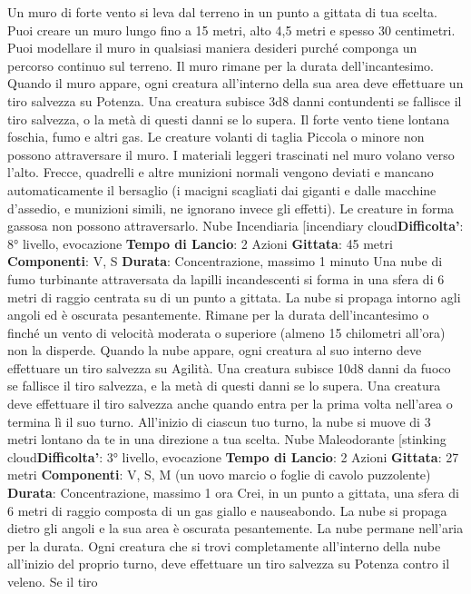\begin{multicols}{2}
Un muro di forte vento si leva dal terreno in un punto a
gittata di tua scelta. Puoi creare un muro lungo fino a 15
metri, alto 4,5 metri e spesso 30 centimetri. Puoi
modellare il muro in qualsiasi maniera desideri purché
componga un percorso continuo sul terreno. Il muro
rimane per la durata dell’incantesimo.
Quando il muro appare, ogni creatura all’interno della
sua area deve effettuare un tiro salvezza su Potenza. Una
creatura subisce 3d8 danni contundenti se fallisce il tiro
salvezza, o la metà di questi danni se lo supera.
Il forte vento tiene lontana foschia, fumo e altri gas. Le
creature volanti di taglia Piccola o minore non possono
attraversare il muro. I materiali leggeri trascinati nel
muro volano verso l’alto. Frecce, quadrelli e altre
munizioni normali vengono deviati e mancano
automaticamente il bersaglio (i macigni scagliati dai
giganti e dalle macchine d’assedio, e munizioni simili,
ne ignorano invece gli effetti). Le creature in forma
gassosa non possono attraversarlo.
Nube Incendiaria
[incendiary cloud\textbf{Difficolta'}:
8° livello, evocazione
\textbf{Tempo di Lancio}: 2 Azioni
\textbf{Gittata}: 45 metri
\textbf{Componenti}: V, S
\textbf{Durata}: Concentrazione, massimo 1 minuto
Una nube di fumo turbinante attraversata da lapilli
incandescenti si forma in una sfera di 6 metri di raggio
centrata su di un punto a gittata. La nube si propaga
intorno agli angoli ed è oscurata pesantemente. Rimane
per la durata dell’incantesimo o finché un vento di
velocità moderata o superiore (almeno 15 chilometri
all’ora) non la disperde.
Quando la nube appare, ogni creatura al suo interno
deve effettuare un tiro salvezza su Agilità. Una
creatura subisce 10d8 danni da fuoco se fallisce il tiro
salvezza, e la metà di questi danni se lo supera. Una
creatura deve effettuare il tiro salvezza anche quando
entra per la prima volta nell’area o termina lì il suo
turno.
All’inizio di ciascun tuo turno, la nube si muove di 3
metri lontano da te in una direzione a tua scelta.
Nube Maleodorante
[stinking cloud\textbf{Difficolta'}:
3° livello, evocazione
\textbf{Tempo di Lancio}: 2 Azioni
\textbf{Gittata}: 27 metri
\textbf{Componenti}: V, S, M (un uovo marcio o foglie di
cavolo puzzolente)
\textbf{Durata}: Concentrazione, massimo 1 ora
Crei, in un punto a gittata, una sfera di 6 metri di raggio
composta di un gas giallo e nauseabondo. La nube si
propaga dietro gli angoli e la sua area è oscurata
pesantemente. La nube permane nell’aria per la durata.
Ogni creatura che si trovi completamente all’interno
della nube all’inizio del proprio turno, deve effettuare un
tiro salvezza su Potenza contro il veleno. Se il tiro

\end{multicols}
